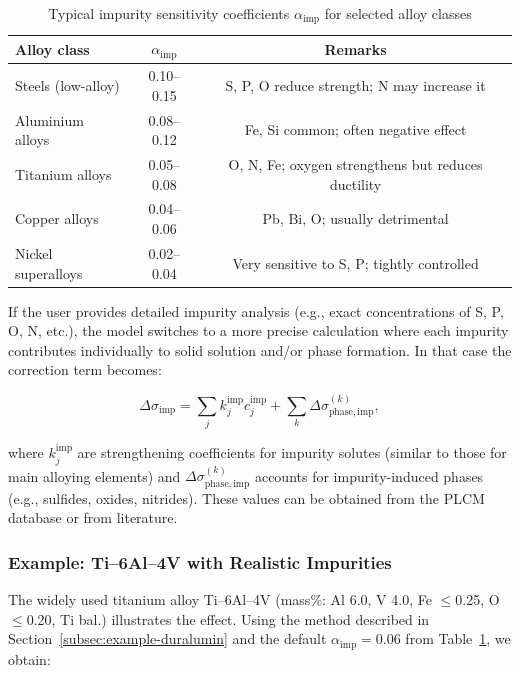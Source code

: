 \documentclass[12pt,a4paper]{article}
\begin{document}
	\begin{table}[htbp]
		\centering
		\caption{Typical impurity sensitivity coefficients \(\alpha_{\mathrm{imp}}\) for selected alloy classes}
		\label{tab:impurity-coefficients}
		\begin{tabular}{lcc}
			\toprule
			\textbf{Alloy class} & \(\alpha_{\mathrm{imp}}\) & \textbf{Remarks} \\
			\midrule
			Steels (low-alloy) & 0.10--0.15 & S, P, O reduce strength; N may increase it \\
			Aluminium alloys & 0.08--0.12 & Fe, Si common; often negative effect \\
			Titanium alloys & 0.05--0.08 & O, N, Fe; oxygen strengthens but reduces ductility \\
			Copper alloys & 0.04--0.06 & Pb, Bi, O; usually detrimental \\
			Nickel superalloys & 0.02--0.04 & Very sensitive to S, P; tightly controlled \\
			\bottomrule
		\end{tabular}
	\end{table}
	
	If the user provides detailed impurity analysis (e.g., exact concentrations of S, P, O, N, etc.), the model switches to a more precise calculation where each impurity contributes individually to solid solution and/or phase formation. In that case the correction term becomes:
	
	\[
	\Delta\sigma_{\mathrm{imp}} = \sum_{j} k_j^{\mathrm{imp}} c_j^{\mathrm{imp}} + \sum_{k} \Delta\sigma_{\mathrm{phase,imp}}^{(k)},
	\]
	
	where \(k_j^{\mathrm{imp}}\) are strengthening coefficients for impurity solutes (similar to those for main alloying elements) and \(\Delta\sigma_{\mathrm{phase,imp}}^{(k)}\) accounts for impurity-induced phases (e.g., sulfides, oxides, nitrides). These values can be obtained from the PLCM database or from literature.
	
	\subsubsection*{Example: Ti--6Al--4V with Realistic Impurities}
	
	The widely used titanium alloy Ti--6Al--4V (mass\%: Al 6.0, V 4.0, Fe \(\le\)0.25, O \(\le\)0.20, Ti bal.) illustrates the effect. Using the method described in Section~\ref{subsec:example-duralumin} and the default \(\alpha_{\mathrm{imp}}=0.06\) from Table~\ref{tab:impurity-coefficients}, we obtain:
	
\end{document}
